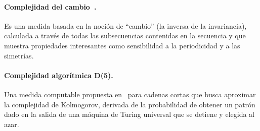 
\paragraph{Complejidad del cambio~\cite{f47}.} Es una medida basada en la noción de ``cambio'' (la inversa de la invariancia), calculada 
a través de todas las subsecuencias contenidas en la secuencia y que muestra propiedades interesantes como sensibilidad a la periodicidad y a las simetrías.


\paragraph{Complejidad algorítmica D(5).} Una medida computable propuesta en~\cite{f44,f45,f46} para cadenas cortas que busca aproximar la complejidad de Kolmogorov, derivada de la probabilidad de obtener un patrón dado en la salida de una máquina de Turing universal que se detiene y elegida al azar.

